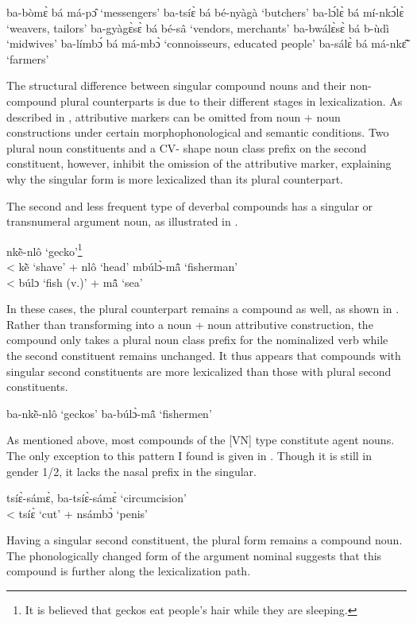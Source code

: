 \ea \label{CompoundVN1b}
\ea  ba-bòmɛ̀ bá má-pɔ̂ `messengers'
\ex ba-tsíɛ̀ bá bé-nyàgà `butchers'
\ex ba-lɔ́lɛ̀ bá mí-nkɔ́lɛ̀ `weavers, tailors'
\ex ba-gyàgɛ̀sɛ̀ bá bé-sâ `vendors, merchants'
\ex ba-bwálɛ̀sɛ̀ bá b-ùdì `midwives'
\ex ba-límbɔ́ bá má-mbɔ̀ `connoisseurs, educated people'
\ex ba-sálɛ̀ bá má-nkɛ̃̂ `farmers'
\z
\z

\noindent The structural difference between singular compound nouns and their non-com\-pound plural counterparts is due to their different stages in lexicalization. As described in , attributive markers can be omitted from noun + noun constructions under certain morphophonological and semantic conditions. Two plural noun constituents and a CV- shape noun class prefix on the second constituent, however, inhibit the omission of the attributive marker,  explaining why the singular form is more lexicalized than its plural counterpart.

The second and less frequent type of deverbal compounds has a singular or transnumeral argument noun, as illustrated in .

\ea \label{CompoundVN2a}
\ea  nkẽ̀-nlô `gecko'\footnote{It is believed that geckos eat people's hair while they are sleeping.} \\ < kẽ̀ `shave' + nlô `head'
\ex mbúlɔ̀-mã̂ `fisherman' \\ < búlɔ `fish (v.)' + mã̂ `sea'
\z
\z

\noindent In these cases, the plural counterpart remains a compound as well, as shown in . Rather than transforming into a noun + noun attributive construction, the compound only takes a plural noun class prefix for the nominalized verb while the second constituent remains unchanged. It thus appears that compounds with singular second constituents are more lexicalized than those with plural second constituents.

\ea \label{CompoundVN2b}
\ea  ba-nkẽ̀-nlô `geckos'
\ex ba-búlɔ̀-mã̂ `fishermen'
\z
\z

As mentioned above, most compounds of the [VN] type constitute agent nouns. The only exception to this pattern I found is given in . Though it is still in gender 1/2, it lacks the nasal prefix in the singular.

\ea \label{CompoundVN3} tsíɛ̀-sámɛ̀, ba-tsíɛ̀-sámɛ̀ `circumcision' \\ < tsíɛ̀ `cut' + nsámbɔ̀ `penis'
\z

\noindent Having a singular second constituent, the plural form remains a compound noun. The phonologically changed form of the argument nominal suggests that this compound is further along the lexicalization path.

